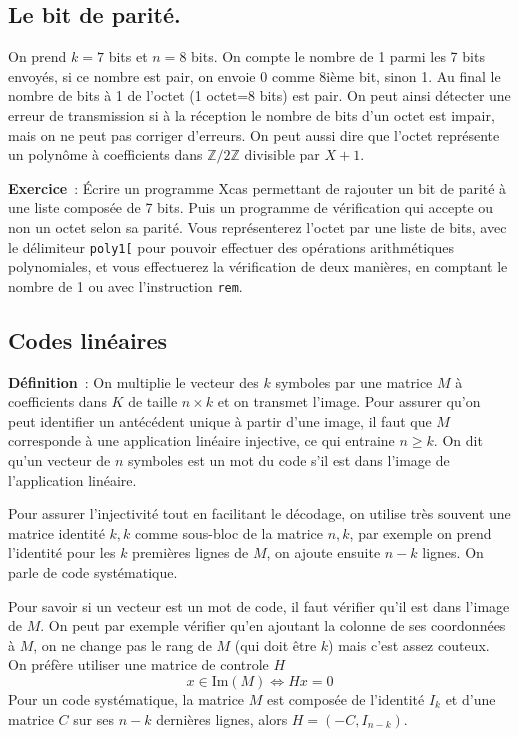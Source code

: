 \documentclass[a4paper,11pt]{book}
\begin{document}
\begin{giacjshere}
\subsection{Le bit de parit\'e.}
On prend $k=7$ bits et $n=8$ bits. On compte
le nombre de 1 parmi les 7 bits envoy\'es, si ce nombre est pair, 
on envoie 0 comme 8i\`eme bit, sinon 1. 
Au final le nombre de bits \`a 1 de l'octet (1 octet=8 bits)
est pair. On peut ainsi d\'etecter une erreur de transmission si
\`a la r\'eception le nombre de bits d'un octet est impair, mais on
ne peut pas corriger d'erreurs.
On peut aussi dire que l'octet
repr\'esente un polyn\^ome \`a coefficients dans $\mathbb{Z}/2\mathbb{Z}$ divisible
par $X+1$.

{\bf Exercice}~:
\'Ecrire un programme Xcas permettant de rajouter un bit de parité
à une liste composée de 7 bits. Puis un programme de vérification
qui accepte ou non un octet selon sa parité. Vous représenterez
l'octet par une liste de bits, avec le délimiteur \verb|poly1[|
pour pouvoir effectuer des opérations arithmétiques polynomiales,
et vous effectuerez la vérification de deux manières, en comptant
le nombre de 1 ou avec l'instruction \verb|rem|.

\subsection{Codes lin\'eaires}
{\bf D\'efinition}~:
On multiplie le vecteur des $k$ symboles par
une matrice $M$ à coefficients dans $K$ de taille $n \times k$
et on transmet l'image.
Pour assurer qu'on peut identifier un antécédent
unique à partir d'une image, il faut que $M$ corresponde 
à une application linéaire injective, ce qui entraine $n\geq k$. 
On dit qu'un vecteur de $n$ symboles est un mot du code 
s'il est dans l'image de l'application lin\'eaire.

Pour assurer l'injectivité tout en facilitant le décodage, 
on utilise tr\`es souvent une matrice identité $k,k$ comme sous-bloc
de la matrice $n,k$, par exemple on prend l'identité pour
les $k$ premières lignes de $M$, on ajoute ensuite $n-k$ lignes.
On parle de code syst\'ematique.

Pour savoir si un vecteur est un mot de code, il faut vérifier
qu'il est dans l'image de $M$. On peut par exemple vérifier
qu'en ajoutant la colonne de ses coordonnées à $M$, on ne change
pas le rang de $M$ (qui doit être $k$) mais c'est assez couteux.
On pr\'ef\`ere utiliser une matrice de controle $H$
$$ x \in \mbox{Im}(M) \Leftrightarrow Hx=0$$
Pour un code syst\'ematique, la matrice $M$ est compos\'ee de l'identit\'e $I_{k}$
et d'une matrice $C$ sur ses $n-k$ derni\`eres lignes, 
alors $H=(-C,I_{n-k})$.
 

\end{giacjshere}
\end{document}
